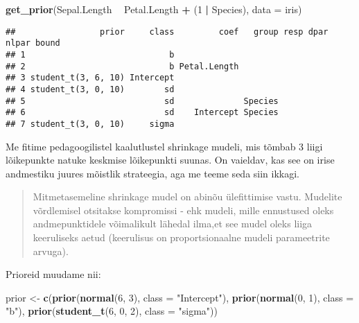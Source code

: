 \documentclass[]{article}
\newenvironment{Shaded}{\begin{snugshade}}{\end{snugshade}}
\newcommand{\KeywordTok}[1]{\textcolor[rgb]{0.13,0.29,0.53}{\textbf{#1}}}
\newcommand{\DataTypeTok}[1]{\textcolor[rgb]{0.13,0.29,0.53}{#1}}
\newcommand{\DecValTok}[1]{\textcolor[rgb]{0.00,0.00,0.81}{#1}}
\newcommand{\StringTok}[1]{\textcolor[rgb]{0.31,0.60,0.02}{#1}}
\newcommand{\OperatorTok}[1]{\textcolor[rgb]{0.81,0.36,0.00}{\textbf{#1}}}
\newcommand{\NormalTok}[1]{#1}
\begin{document}
\begin{Shaded}
\begin{Highlighting}[]
\KeywordTok{get_prior}\NormalTok{(Sepal.Length }\OperatorTok{~}\StringTok{ }\NormalTok{Petal.Length }\OperatorTok{+}\StringTok{ }\NormalTok{(}\DecValTok{1} \OperatorTok{|}\StringTok{ }\NormalTok{Species), }
          \DataTypeTok{data =}\NormalTok{ iris)}
\end{Highlighting}
\end{Shaded}

\begin{verbatim}
##                 prior     class         coef   group resp dpar nlpar bound
## 1                             b                                           
## 2                             b Petal.Length                              
## 3 student_t(3, 6, 10) Intercept                                           
## 4 student_t(3, 0, 10)        sd                                           
## 5                            sd              Species                      
## 6                            sd    Intercept Species                      
## 7 student_t(3, 0, 10)     sigma
\end{verbatim}

Me fitime pedagoogilistel kaalutlustel shrinkage mudeli, mis tõmbab 3
liigi lõikepunkte natuke keskmise lõikepunkti suunas. On vaieldav, kas
see on irise andmestiku juures mõistlik strateegia, aga me teeme seda
siin ikkagi.

\begin{quote}
Mitmetasemeline shrinkage mudel on abinõu ülefittimise vastu. Mudelite
võrdlemisel otsitakse kompromissi - ehk mudeli, mille ennustused oleks
andmepunktidele võimalikult lähedal ilma,et see mudel oleks liiga
keeruliseks aetud (keerulisus on proportsionaalne mudeli parameetrite
arvuga).
\end{quote}

Prioreid muudame nii:

\begin{Shaded}
\begin{Highlighting}[]
\NormalTok{prior <-}\StringTok{ }\KeywordTok{c}\NormalTok{(}\KeywordTok{prior}\NormalTok{(}\KeywordTok{normal}\NormalTok{(}\DecValTok{6}\NormalTok{, }\DecValTok{3}\NormalTok{), }\DataTypeTok{class =} \StringTok{"Intercept"}\NormalTok{),}
           \KeywordTok{prior}\NormalTok{(}\KeywordTok{normal}\NormalTok{(}\DecValTok{0}\NormalTok{, }\DecValTok{1}\NormalTok{), }\DataTypeTok{class =} \StringTok{"b"}\NormalTok{),}
           \KeywordTok{prior}\NormalTok{(}\KeywordTok{student_t}\NormalTok{(}\DecValTok{6}\NormalTok{, }\DecValTok{0}\NormalTok{, }\DecValTok{2}\NormalTok{), }\DataTypeTok{class =} \StringTok{"sigma"}\NormalTok{))}
\end{Highlighting}
\end{Shaded}
\end{document}
